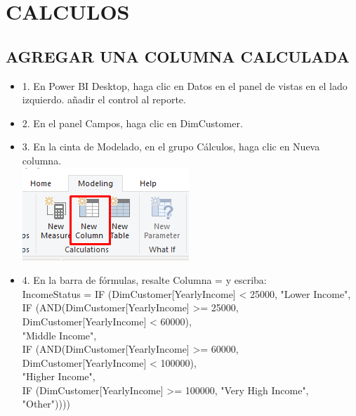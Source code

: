 \section{CALCULOS} 
\subsection{AGREGAR UNA COLUMNA CALCULADA}

\begin{itemize}

\item 1. En Power BI Desktop, haga clic en Datos en el panel de vistas en el lado izquierdo.
añadir el control al reporte.
\item 2. En el panel Campos, haga clic en DimCustomer.
\item 3. En la cinta de Modelado, en el grupo Cálculos, haga clic en Nueva columna.\\
\includegraphics[scale=0.5]{./Imagenes/image015}
\item 4. En la barra de fórmulas, resalte Columna = y escriba: \\
IncomeStatus = IF (DimCustomer[YearlyIncome] < 25000, "Lower Income",\\
IF (AND(DimCustomer[YearlyIncome] >= 25000, DimCustomer[YearlyIncome] < 60000),\\
"Middle Income",\\
IF (AND(DimCustomer[YearlyIncome] >= 60000, DimCustomer[YearlyIncome] < 100000),\\
"Higher Income",\\
IF (DimCustomer[YearlyIncome] >= 100000, "Very High Income", "Other")))) \\


\end{itemize}
